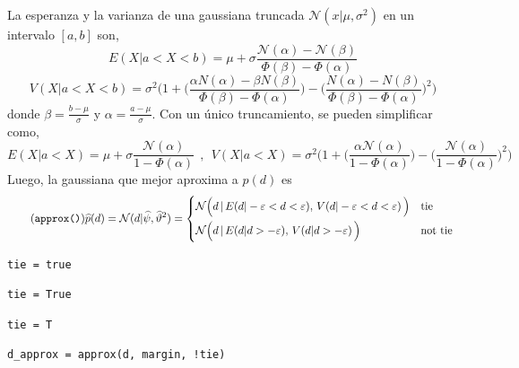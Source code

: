 \documentclass[a4paper,11pt]{book}
\newcommand{\N}{\mathcal{N}}
\theoremstyle{definition}
\begin{document}
%
La esperanza y la varianza de una gaussiana truncada $\N(x|\mu,\sigma^2)$ en un intervalo $[a,b]$ son,
%
\begin{equation}\label{eq:mean_aprox_double}
 E(X| a < X < b) = \mu + \sigma \frac{\N(\alpha) - \N(\beta) }{\Phi(\beta) - \Phi(\alpha) }
\end{equation}
%
\begin{equation}\label{eq:variance_aprox_double}
 V(X| a < X < b) = \sigma^2 \Bigg( 1 + \bigg(\frac{\alpha N(\alpha) - \beta N(\beta) }{\Phi(\beta) - \Phi(\alpha) }\bigg) - \bigg(\frac{N(\alpha) - N(\beta) }{\Phi(\beta) - \Phi(\alpha) }\bigg)^2 \Bigg)
\end{equation}
%
donde $\beta = \frac{b-\mu}{\sigma}$ y $\alpha = \frac{a-\mu}{\sigma}$.
%
Con un \'unico truncamiento, se pueden simplificar como,
%
\begin{equation*}
 E(X| a < X )   =  \mu + \sigma \frac{\N(\alpha)}{1 - \Phi(\alpha) } \ \ , \ \ V(X| a < X )  = \sigma^2 \Bigg( 1 + \bigg(\frac{\alpha \N(\alpha)}{1 - \Phi(\alpha) }\bigg) - \bigg(\frac{\N(\alpha)}{1 - \Phi(\alpha) }\bigg)^2 \Bigg)
\end{equation*}
%
Luego, la gaussiana que mejor aproxima a $p(d)$ es
%
\begin{equation}\label{eq:p*_d} \tag{\texttt{approx()}}
 \widehat{p}(d) = \N(d | \widehat{\psi}, \widehat{\vartheta}^2) =
 \begin{cases*}
 \N\Big(d \,  | \, E(d | -\varepsilon < d < \varepsilon ) , \,  V(d | -\varepsilon < d < \varepsilon ) \, \Big) & \text{tie} \\
\N\Big(d \,  | \, E(d | d > -\varepsilon ) , \,  V(d | d > -\varepsilon ) \, \Big) & \text{not tie}
  \end{cases*}
\end{equation}
%
\begin{paracol}{3}
\begin{lstlisting}[backgroundcolor=\color{julia!60},belowskip=0cm]
tie = true
\end{lstlisting}
\switchcolumn
\begin{lstlisting}[backgroundcolor=\color{python!60},belowskip=0cm]
tie = True
\end{lstlisting}
\switchcolumn
\begin{lstlisting}[backgroundcolor=\color{r!50},belowskip=0cm]
tie = T
\end{lstlisting}
\end{paracol}
\begin{lstlisting}[captionpos=b,backgroundcolor=\color{all},label=lst:d_approx, caption={Computando la aproximaci\'on de la diferencia de desempeños},belowskip=0cm,aboveskip=0cm]
d_approx = approx(d, margin, !tie)
\end{lstlisting}
\end{document}

